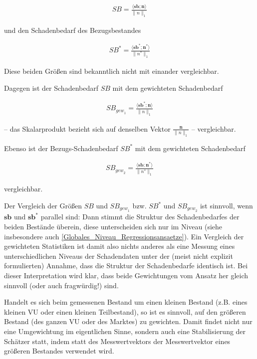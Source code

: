 \begin{eqnarray}
SB = \frac{\langle \mathbf{sb};\mathbf{n}\rangle}{\|n\|_1}
\end{eqnarray}
	
und den Schadenbedarf des Bezugsbestandes
	
\begin{eqnarray}
SB^* = \frac{\langle \mathbf{sb}^*;\mathbf{n}^*\rangle}{\|n^*\|_1}
\end{eqnarray}

Diese beiden Größen sind bekanntlich nicht mit einander vergleichbar.

Dagegen ist der Schadenbedarf $SB$ mit dem gewichteten Schadenbedarf
	
\begin{eqnarray}
SB_{{gew}_1} = \frac{\langle \mathbf{sb}^*;\mathbf{n}\rangle}{\|n\|_1}
\end{eqnarray}
	
– das Skalarprodukt bezieht sich auf denselben Vektor  $\frac{\mathbf{n}}{\|n\|_1}$ – vergleichbar.

Ebenso ist der Bezugs-Schadenbedarf $SB^*$ mit dem gewichteten Schadenbedarf

\begin{eqnarray}
SB_{{gew}_2} = \frac{\langle \mathbf{sb};\mathbf{n}^*\rangle}{\|n^*\|_1}
\end{eqnarray}

vergleichbar.

Der Vergleich der Größen $SB$  und $SB_{{gew}_1}$  bzw. $SB^*$  und $SB_{{gew}_2}$  ist sinnvoll, wenn $\mathbf{sb}$  und $\mathbf{sb}^*$  parallel sind: Dann stimmt die Struktur des Schadenbedarfes der beiden Bestände überein, diese unterscheiden sich nur im Niveau (siehe insbesondere auch \ref{Globales_Niveau_Regressionsansaetze}). Ein Vergleich der gewichteten Statistiken ist damit also nichts anderes als eine Messung eines unterschiedlichen Niveaus der Schadendaten unter der (meist nicht explizit formulierten) Annahme, dass die Struktur der Schadenbedarfe identisch ist. Bei dieser Interpretation wird klar, dass beide Gewichtungen vom Ansatz her gleich sinnvoll (oder auch fragwürdig!) sind.

Handelt es sich beim gemessenen Bestand um einen kleinen Bestand (z.B. eines kleinen VU oder einen kleinen Teilbestand), so ist es sinnvoll, auf den größeren Bestand (des ganzen VU oder des Marktes) zu gewichten. Damit findet nicht nur eine Umgewichtung im eigentlichen Sinne, sondern auch eine Stabilisierung der Schätzer statt, indem statt des Messwertvektors   der Messwertvektor  eines größeren Bestandes verwendet wird.


